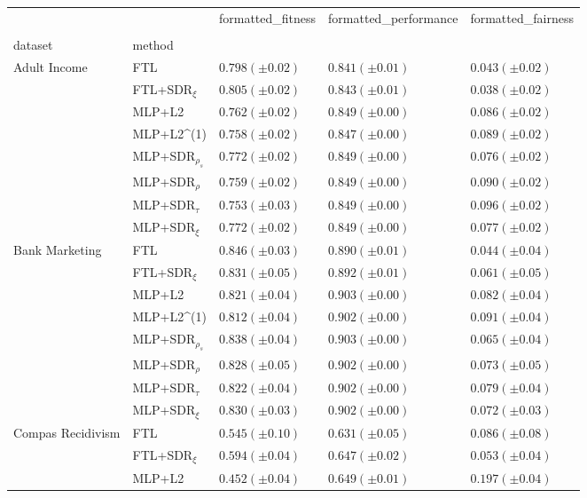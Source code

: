 \begin{tabular}{lllll}
\toprule
 &  & formatted_fitness & formatted_performance & formatted_fairness \\
 &  &  &  &  \\
dataset & method &  &  &  \\
\midrule
\multirow[t]{8}{*}{Adult Income} & FTL & $0.798 (\pm0.02)$ & $0.841 (\pm0.01)$ & $0.043 (\pm0.02)$ \\
 & FTL+SDR$_{\xi}$ & $0.805 (\pm0.02)$ & $0.843 (\pm0.01)$ & $0.038 (\pm0.02)$ \\
 & MLP+L2 & $0.762 (\pm0.02)$ & $0.849 (\pm0.00)$ & $0.086 (\pm0.02)$ \\
 & MLP+L2^{(1)} & $0.758 (\pm0.02)$ & $0.847 (\pm0.00)$ & $0.089 (\pm0.02)$ \\
 & MLP+SDR$_{\rho_s}$ & $0.772 (\pm0.02)$ & $0.849 (\pm0.00)$ & $0.076 (\pm0.02)$ \\
 & MLP+SDR$_{\rho}$ & $0.759 (\pm0.02)$ & $0.849 (\pm0.00)$ & $0.090 (\pm0.02)$ \\
 & MLP+SDR$_{\tau}$ & $0.753 (\pm0.03)$ & $0.849 (\pm0.00)$ & $0.096 (\pm0.02)$ \\
 & MLP+SDR$_{\xi}$ & $0.772 (\pm0.02)$ & $0.849 (\pm0.00)$ & $0.077 (\pm0.02)$ \\
\cline{1-5}
\multirow[t]{8}{*}{Bank Marketing} & FTL & $0.846 (\pm0.03)$ & $0.890 (\pm0.01)$ & $0.044 (\pm0.04)$ \\
 & FTL+SDR$_{\xi}$ & $0.831 (\pm0.05)$ & $0.892 (\pm0.01)$ & $0.061 (\pm0.05)$ \\
 & MLP+L2 & $0.821 (\pm0.04)$ & $0.903 (\pm0.00)$ & $0.082 (\pm0.04)$ \\
 & MLP+L2^{(1)} & $0.812 (\pm0.04)$ & $0.902 (\pm0.00)$ & $0.091 (\pm0.04)$ \\
 & MLP+SDR$_{\rho_s}$ & $0.838 (\pm0.04)$ & $0.903 (\pm0.00)$ & $0.065 (\pm0.04)$ \\
 & MLP+SDR$_{\rho}$ & $0.828 (\pm0.05)$ & $0.902 (\pm0.00)$ & $0.073 (\pm0.05)$ \\
 & MLP+SDR$_{\tau}$ & $0.822 (\pm0.04)$ & $0.902 (\pm0.00)$ & $0.079 (\pm0.04)$ \\
 & MLP+SDR$_{\xi}$ & $0.830 (\pm0.03)$ & $0.902 (\pm0.00)$ & $0.072 (\pm0.03)$ \\
\cline{1-5}
\multirow[t]{8}{*}{Compas Recidivism} & FTL & $0.545 (\pm0.10)$ & $0.631 (\pm0.05)$ & $0.086 (\pm0.08)$ \\
 & FTL+SDR$_{\xi}$ & $0.594 (\pm0.04)$ & $0.647 (\pm0.02)$ & $0.053 (\pm0.04)$ \\
 & MLP+L2 & $0.452 (\pm0.04)$ & $0.649 (\pm0.01)$ & $0.197 (\pm0.04)$ \\

\end{tabular}
